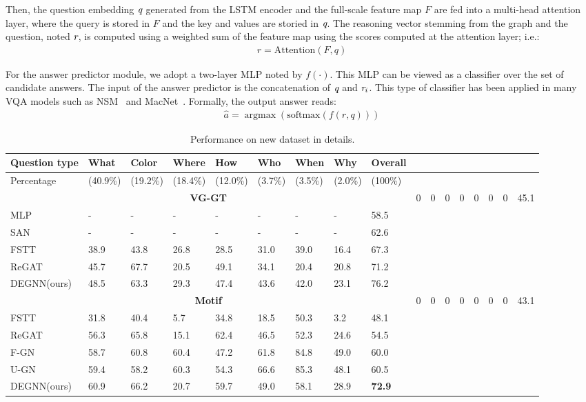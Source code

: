 \documentclass[letterpaper]{article} %
\begin{document}
Then, the question embedding $\emph{q}$ generated from the LSTM encoder and the full-scale feature map $F$ are fed into a multi-head attention layer, where the query is stored in $F$ and the key and values are storied in $\emph{q}$.
The reasoning vector stemming from the graph and the question, noted $\emph{r}$, is computed using a weighted sum of the feature map using the scores computed at the attention layer; i.e.:
\begin{gather}
    r = \text{Attention}(F, q)
\end{gather}

For the answer predictor module, we adopt a two-layer MLP noted by $f(\cdot)$. This MLP can be viewed as a classifier over the set of candidate answers. 
The input of the answer predictor is the concatenation of $\emph{q}$ and $\emph{r}_i$. 
This type of classifier has been applied in many VQA models such as NSM~\cite{DBLP:conf/nips/HudsonM19} and MacNet~\cite{DBLP:conf/nips/LuYBP16}.
Formally, the output answer reads:
\begin{gather}
    \hat{a} = \mathop{\arg\max}(\text{softmax}(f(r, q)))
\end{gather}
\begin{table}
\centering
    \begin{tabular}{l|lllllllll}
    \hline
    \textbf{Question type}&\textbf{What}&\textbf{Color}&\textbf{Where}&\textbf{How}&\textbf{Who}&\textbf{When}&\textbf{Why}&\textbf{Overall}\\
    \hline
     Percentage &(40.9\%) &(19.2\%) &(18.4\%) &(12.0\%) &(3.7\%) &(3.5\%) &(2.0\%) &(100\%)\\
    \hline
    \multicolumn{9}{c}{\bf VG-GT} \cr\hline %
     NSM &0 &0 &0 &0 &0 &0 &0 &45.1\\
     MLP &- &- &- &- &- &- &- &58.5\\
     SAN &- &- &- &- &- &- &- &62.6\\
     FSTT &38.9 &43.8 &26.8 &28.5 &31.0 &39.0 &16.4 &67.3\\
     ReGAT &45.7 &67.7 &20.5 &49.1 &34.1 &20.4 &20.8 &71.2\\
     DEGNN(ours) &48.5 &63.3 &29.3 &47.4 &43.6 &42.0 &23.1 &76.2\\
    \hline
     \multicolumn{9}{c}{\bf Motif} \cr\hline
     NSM &0 &0 &0 &0 &0 &0 &0 &43.1\\
     FSTT &31.8 &40.4 &5.7 &34.8 &18.5 &50.3 &3.2 &48.1\\
     ReGAT &56.3 &65.8 &15.1 &62.4 &46.5 &52.3 &24.6 &54.5\\
     F-GN &58.7 &60.8 &60.4 &47.2 &61.8 &84.8 &49.0 &60.0\\
     U-GN &59.4 &58.2 &60.3 &54.3 &66.6 &85.3 &48.1 &60.5\\
     DEGNN(ours) &60.9 &66.2 &20.7 &59.7 &49.0 &58.1 &28.9 &\textbf{72.9}\\
    \hline
    \end{tabular}
\caption{\label{new-detail}
Performance on new dataset in details.
}
\end{table}
\end{document}
